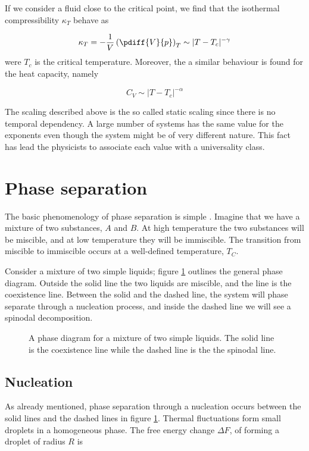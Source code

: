 If we consider a fluid close to the critical point, we find that the
isothermal compressibility $\kappa_T$ behave as

\begin{equation}
  \kappa_T = - \frac{1}{V} \left(\pdiff{V}{p}\right)_T
     \sim |T - T_c|^{-\gamma}
\end{equation}
were $T_c$ is the critical temperature. Moreover, the a similar
behaviour is found for the heat capacity, namely

\begin{equation}
  C_V \sim |T - T_c|^{-\alpha}
\end{equation}

The scaling described above is the so called static scaling since there
is no temporal dependency. A large number of systems has the same value
for the exponents even though the system might be of very different
nature. This fact has lead the physicists to associate each value with
a universality class.


\section{Phase separation}
\label{sect:PhaseSep}
The basic phenomenology of phase separation is simple \cite{Goldenfeld92}.
Imagine that we
have a mixture of two substances, $A$ and $B$. At high temperature the
two substances will be miscible, and at low temperature they will be
immiscible. The transition from miscible to immiscible occurs at a
well-defined temperature, $T_C$.

Consider a mixture of two simple liquids; figure \ref{fig:SpinodalDiag}
outlines the general phase diagram. Outside the solid line the two
liquids are miscible, and the line is the coexistence line. Between the
solid and the dashed line, the system will phase separate through a
nucleation process, and inside the dashed line we will see a spinodal
decomposition. 

\begin{figure}
  \begin{center}
    
  \end{center}
  \caption[Phase diagram of a mixture]{A phase diagram for a mixture of
  two simple liquids. The solid line is the coexistence line while the
  dashed line is the the spinodal line.\label{fig:SpinodalDiag}}
\end{figure}

\subsection{Nucleation}
As already mentioned, phase separation through a
nucleation occurs between the solid lines and the dashed lines in
figure \ref{fig:SpinodalDiag}. Thermal fluctuations form small droplets
in a homogeneous phase. The free energy change $\Delta F$, of forming a
droplet of radius $R$ is

